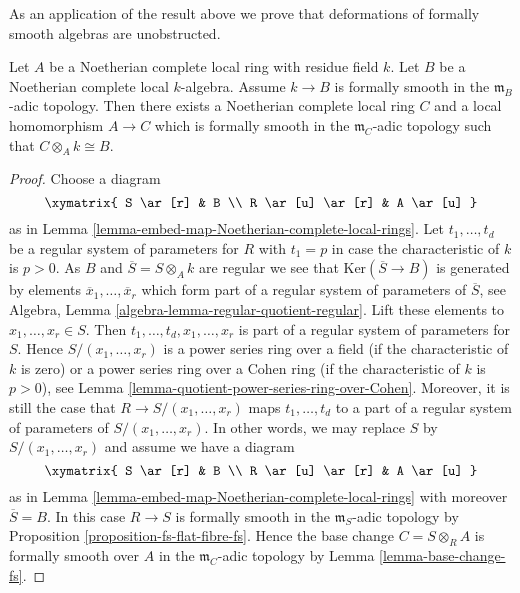\noindent
As an application of the result above we prove that deformations
of formally smooth algebras are unobstructed.

\begin{lemma}
\label{lemma-lift-fs}
Let $A$ be a Noetherian complete local ring with residue field $k$.
Let $B$ be a Noetherian complete local $k$-algebra. Assume $k \to B$
is formally smooth in the $\mathfrak m_B$-adic topology.
Then there exists a Noetherian complete local ring $C$
and a local homomorphism $A \to C$ which is formally smooth
in the $\mathfrak m_C$-adic topology such that $C \otimes_A k \cong B$.\
\end{lemma}

\begin{proof}
Choose a diagram
$$
\xymatrix{
S \ar[r] & B \\
R \ar[u] \ar[r] & A \ar[u]
}
$$
as in Lemma \ref{lemma-embed-map-Noetherian-complete-local-rings}.
Let $t_1, \ldots, t_d$ be a regular system of parameters for $R$
with $t_1 = p$ in case the characteristic of $k$ is $p > 0$.
As $B$ and $\overline{S} = S \otimes_A k$
are regular we see that $\text{Ker}(\overline{S} \to B)$ is generated by
elements $\overline{x}_1, \ldots, \overline{x}_r$ which form part of a
regular system of parameters of $\overline{S}$, see
Algebra, Lemma \ref{algebra-lemma-regular-quotient-regular}.
Lift these elements to $x_1, \ldots, x_r \in S$. Then
$t_1, \ldots, t_d, x_1, \ldots, x_r$ is part of a regular system of
parameters for $S$. Hence $S/(x_1, \ldots, x_r)$ is a power
series ring over a field (if the characteristic of $k$ is zero)
or a power series ring over a Cohen ring (if the characteristic of
$k$ is $p > 0$), see
Lemma \ref{lemma-quotient-power-series-ring-over-Cohen}.
Moreover, it is still the case that $R \to S/(x_1, \ldots, x_r)$
maps $t_1, \ldots, t_d$ to a part of a regular system of parameters
of $S/(x_1, \ldots, x_r)$. In other words, we may replace $S$ by
$S/(x_1, \ldots, x_r)$ and assume we have a diagram
$$
\xymatrix{
S \ar[r] & B \\
R \ar[u] \ar[r] & A \ar[u]
}
$$
as in Lemma \ref{lemma-embed-map-Noetherian-complete-local-rings}
with moreover $\overline{S} = B$. In this case $R \to S$ is
formally smooth in the $\mathfrak m_S$-adic topology by
Proposition \ref{proposition-fs-flat-fibre-fs}.
Hence the base change $C = S \otimes_R A$ is formally smooth
over $A$ in the $\mathfrak m_C$-adic topology by
Lemma \ref{lemma-base-change-fs}.
\end{proof}

